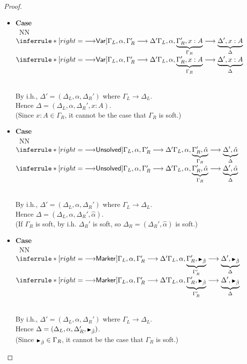 \documentclass[a4paper]{article}
\newcommand{\smallblacktriangle}{\text{\textscale{0.7}{$\blacktriangleright$}}}
\newcommand{\MonnierCommaSym}{{\smallblacktriangle}}
\newcommand{\MonnierComma}[1]{{\MonnierCommaSym}_{#1}}
\gdef\xxDerivationProofCaseColor{N}
\newcommand{\DerivationProofCase}[3]{\smallskip
     \item \parbox[t]{100ex}{\textbf{Case } \\[-0.5em]
       $~$\hspace{5ex}
       \if\xxDerivationProofCaseColor N\ensuremath{\Infer{#1}{#2}{#3}}
       \else \colorbox{\xxDerivationProofCaseColor}{\ensuremath{\Infer{#1}{#2}{#3}}}\fi }\nopagebreak \\[-0.8ex]
  }
\newcommand{\Infer}[3]{\inferrule*[right={\text{\strut#1}}]{{}#2\mathstrut}{{}#3\mathstrut}}
\newcommand{\extendssym}{\longrightarrow}
\newcommand{\extends}[2]{{#1} \extendssym {#2}}
\newcommand{\substextend}[2]{\extends{#1}{#2}}
\newcommand{\ahat}{\hat{\alpha}}
\newcommand{\bhat}{\hat{\beta}}
\newcommand{\rulename}[1]{\text{\normalfont\textsf{#1}}}
\newcommand{\substextendrulename}[1]{\ensuremath{{\extendssym}{\rulename{#1}}}\xspace}
\newcommand{\substextendVV}{\substextendrulename{Var}}
\newcommand{\substextendEE}{\substextendrulename{Unsolved}}
\newcommand{\substextendMonMon}{\substextendrulename{Marker}}
\begin{document}
\begin{proof}
\begin{enumerate}[(i)]
\begin{itemize}
\begin{itemize}
            By i.h., $\Delta' = (\Delta_L, \alpha, \Delta_R')$
              where $\substextend{\Gamma_L}{\Delta_L}$. \\
            Hence $\Delta = (\Delta_L, \alpha, \Delta_R', \beta)$. \\
            (Since $\beta \in \Gamma_R$, it cannot be the case that $\Gamma_R$ is soft.)
          \end{itemize}

    \DerivationProofCase{\substextendVV}
              {\substextend{\Gamma_L, \alpha, \Gamma'_R}{\Delta'}}
              {\substextend{\Gamma_L, \alpha, \underbrace{\Gamma'_R, x:A}_{\Gamma_R}}
                 {\underbrace{\Delta', x:A}_{\Delta}}}

            By i.h., $\Delta' = (\Delta_L, \alpha, \Delta_R')$
              where $\substextend{\Gamma_L}{\Delta_L}$. \\
            Hence $\Delta = (\Delta_L, \alpha, \Delta_R', x:A)$. \\
            (Since $x:A \in \Gamma_R$, it cannot be the case that $\Gamma_R$ is soft.)

        \DerivationProofCase{\substextendEE}
            { \substextend{\Gamma_L, \alpha, \Gamma'_R}{\Delta'} }
            { \substextend{\Gamma_L, \alpha, \underbrace{\Gamma'_R, \ahat}_{\Gamma_R}}
                {\underbrace{\Delta', \ahat}_{\Delta}} }

            By i.h., $\Delta' = (\Delta_L, \alpha, \Delta_R')$
              where $\substextend{\Gamma_L}{\Delta_L}$. \\
            Hence $\Delta = (\Delta_L, \alpha, \Delta_R', \ahat)$.  \\
            (If $\Gamma_R$ is soft, by i.h. $\Delta_R'$ is soft, so $\Delta_R = (\Delta_R', \ahat)$ is soft.)

        \DerivationProofCase{\substextendMonMon}
            { \substextend{\Gamma_L, \alpha, \Gamma'_R}{\Delta'} }
            { \substextend{\Gamma_L, \alpha,
                 \underbrace{\Gamma'_R, \MonnierComma{\bhat}}_{\Gamma'_R}}
                 {\underbrace{\Delta', \MonnierComma{\bhat}}_{\Delta}} }

            By i.h., $\Delta' = (\Delta_L, \alpha, \Delta_R')$
              where $\substextend{\Gamma_L}{\Delta_L}$. \\
            Hence $\Delta = (\Delta_L, \alpha, \Delta_R', \MonnierComma{\bhat})$.  \\
            (Since $\MonnierComma{\bhat} \in \Gamma_R$, it cannot be the case that $\Gamma_R$ is soft.)


\end{itemize}
\end{enumerate}
\end{proof}
\end{document}
